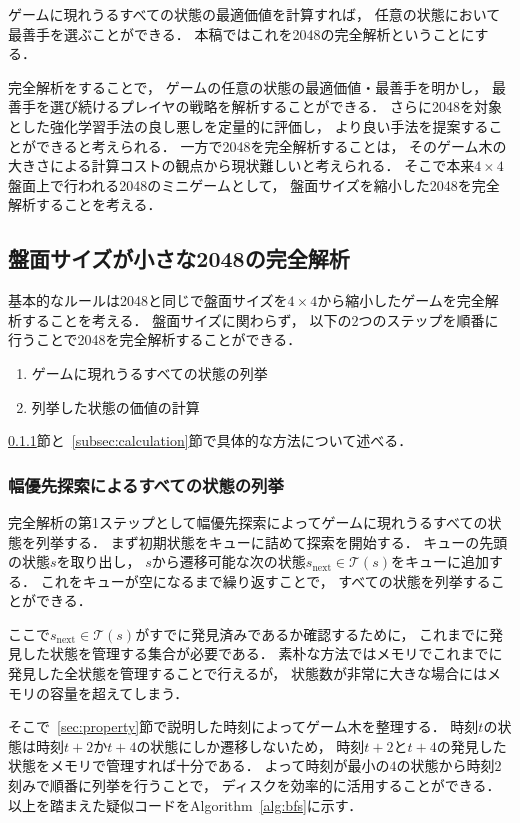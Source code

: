 ゲームに現れうるすべての状態の最適価値を計算すれば， 任意の状態において最善手を選ぶことができる．
本稿ではこれを2048の完全解析ということにする．

完全解析をすることで， ゲームの任意の状態の最適価値・最善手を明かし， 最善手を選び続けるプレイヤの戦略を解析することができる．
さらに2048を対象とした強化学習手法の良し悪しを定量的に評価し， より良い手法を提案することができると考えられる．
一方で2048を完全解析することは， そのゲーム木の大きさによる計算コストの観点から現状難しいと考えられる．
そこで本来$4\times4$盤面上で行われる2048のミニゲームとして， 盤面サイズを縮小した2048を完全解析することを考える．

\subsection{盤面サイズが小さな2048の完全解析}
\label{sec:mini2048}
基本的なルールは2048と同じで盤面サイズを$4\times4$から縮小したゲームを完全解析することを考える．
盤面サイズに関わらず， 以下の$2$つのステップを順番に行うことで2048を完全解析することができる．

\begin{enumerate}
    \item ゲームに現れうるすべての状態の列挙
    \item 列挙した状態の価値の計算
\end{enumerate}

\ref{subsec:enumeration}節と~\ref{subsec:calculation}節で具体的な方法について述べる．

\subsubsection{幅優先探索によるすべての状態の列挙}
\label{subsec:enumeration}
完全解析の第1ステップとして幅優先探索によってゲームに現れうるすべての状態を列挙する．
まず初期状態をキューに詰めて探索を開始する．
キューの先頭の状態$s$を取り出し， $s$から遷移可能な次の状態$s_{\text{next}} \in \mathcal{T}(s)$をキューに追加する．
これをキューが空になるまで繰り返すことで， すべての状態を列挙することができる．

ここで$s_{\text{next}} \in \mathcal{T}(s)$がすでに発見済みであるか確認するために， これまでに発見した状態を管理する集合が必要である．
素朴な方法ではメモリでこれまでに発見した全状態を管理することで行えるが， 状態数が非常に大きな場合にはメモリの容量を超えてしまう．

そこで~\ref{sec:property}節で説明した時刻によってゲーム木を整理する．
時刻$t$の状態は時刻$t+2$か$t+4$の状態にしか遷移しないため， 時刻$t+2$と$t+4$の発見した状態をメモリで管理すれば十分である．
よって時刻が最小の$4$の状態から時刻$2$刻みで順番に列挙を行うことで， ディスクを効率的に活用することができる．
以上を踏まえた疑似コードをAlgorithm~\ref{alg:bfs}に示す．

